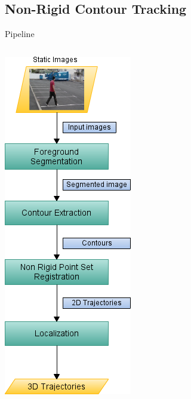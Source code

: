 \graphicspath{
  {./images/bmps/}{./images/vects/}{./images/}
  {./images/presentation/bmps/}{./images/presentation/vects/}{./images/presentation/}
  {./images/chapter00/bmps/}{./images/chapter00/vects/}{./images/chapter00/}
  {./images/chapter02/bmps/}{./images/chapter02/vects/}{./images/chapter02/}
}

\subsection{Non-Rigid Contour Tracking}

\begin{frame}[plain]{Pipeline}
  \begin{columns}[c] %
      \includegraphics[height=1.1\textheight]{pipeline_cp02}
      \vspace{-1cm}
      \begin{figure}[t]
	\centering
	\begin{subfigure}[b]{0.3\columnwidth}

\end{subfigure}
\end{figure}
\end{columns}
\end{frame}
